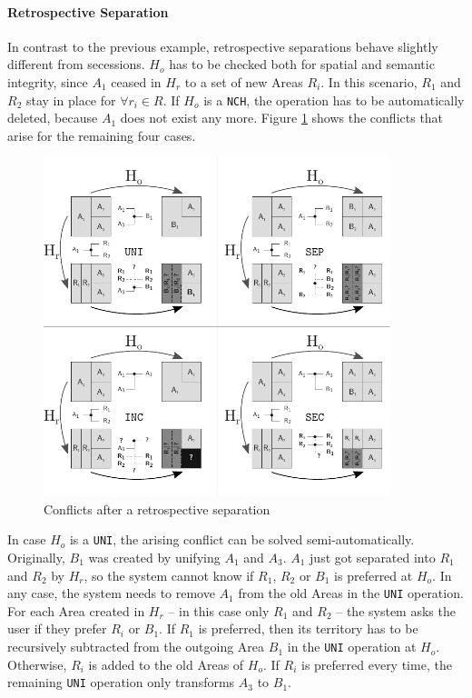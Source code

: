 
\paragraph{Retrospective Separation} %
\label{par:retrospective_separation}

In contrast to the previous example, retrospective separations behave slightly different from secessions. $H_o$ has to be checked both for spatial and semantic integrity, since $A_1$ ceased in $H_r$ to a set of new Areas $R_i$. In this scenario, $R_1$ and $R_2$ stay in place for $\forall r_i \in R$. If $H_o$ is a \texttt{NCH}, the operation has to be automatically deleted, because $A_1$ does not exist any more. Figure \ref{fig:update_conflict_SEP} shows the conflicts that arise for the remaining four cases.

\begin{figure}[ht]
\vspace{1em}
  \centering
  \includegraphics[width=0.9\textwidth]{graphics/development/editing_hivent_data/retrospective_updates/SEP}
  \caption{Conflicts after a retrospective separation}
  \label{fig:update_conflict_SEP}
\end{figure}

In case $H_o$ is a \texttt{UNI}, the arising conflict can be solved semi-automatically. Originally, $B_1$ was created by unifying $A_1$ and $A_3$. $A_1$ just got separated into $R_1$ and $R_2$ by $H_r$, so the system cannot know if $R_1$, $R_2$ or $B_1$ is preferred at $H_o$. In any case, the system needs to remove $A_1$ from the old Areas in the \texttt{UNI} operation. For each Area created in $H_r$ -- in this case only $R_1$ and $R_2$ -- the system asks the user if they prefer $R_i$ or $B_1$. If $R_1$ is preferred, then its territory has to be recursively subtracted from the outgoing Area $B_1$ in the \texttt{UNI} operation at $H_o$. Otherwise, $R_i$ is added to the old Areas of $H_o$. If $R_i$ is preferred every time, the remaining \texttt{UNI} operation only transforms $A_3$ to $B_1$.

